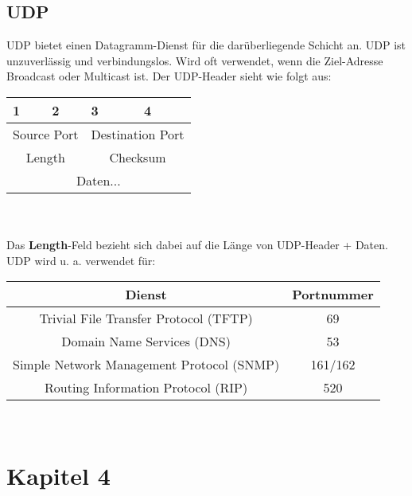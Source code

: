 \documentclass[a4paper,10pt]{scrartcl}
\begin{document}
    \subsection{UDP}
        UDP bietet einen Datagramm-Dienst für die darüberliegende Schicht an. UDP ist unzuverlässig und verbindungslos. Wird oft verwendet, wenn die Ziel-Adresse Broadcast oder Multicast ist. Der UDP-Header sieht wie folgt aus:\\
        \begin{tabular}{|p{3cm}|p{3cm}|p{3cm}|p{3cm}|}
            \toprule 
            1 & 2 & 3 & 4  \\
            \midrule\midrule
            \multicolumn{2}{|c|}{Source Port} & \multicolumn{2}{|c|}{Destination Port}\\
            \midrule
            \multicolumn{2}{|c|}{Length} & \multicolumn{2}{|c|}{Checksum}\\
            \midrule
            \multicolumn{4}{|c|}{Daten...}\\
            \bottomrule
        \end{tabular}\\ \\
        Das \textbf{Length}-Feld bezieht sich dabei auf die Länge von UDP-Header + Daten. \\
        UDP wird u. a. verwendet für:\\ 
        \begin{tabular}{|c|c|}
            \hline
            Dienst & Portnummer \\
            \hline
            Trivial File Transfer Protocol (TFTP) & 69 \\
            Domain Name Services (DNS) & 53 \\
            Simple Network Management Protocol (SNMP) & 161/162\\
            Routing Information Protocol (RIP) & 520\\
            \hline
        \end{tabular}  \\ 


        \section{Kapitel 4}
\end{document}

